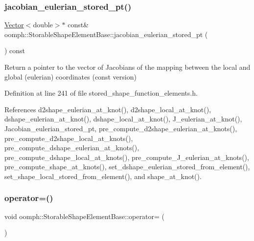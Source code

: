 \subsubsection{\texorpdfstring{jacobian\+\_\+eulerian\+\_\+stored\+\_\+pt()}{jacobian\_eulerian\_stored\_pt()}\hspace{0.1cm}{\footnotesize\ttfamily [2/2]}}
{\footnotesize\ttfamily \hyperlink{classoomph_1_1Vector}{Vector}$<$double$>$$\ast$ const\& oomph\+::\+Storable\+Shape\+Element\+Base\+::jacobian\+\_\+eulerian\+\_\+stored\+\_\+pt (\begin{DoxyParamCaption}{ }\end{DoxyParamCaption}) const\hspace{0.3cm}{\ttfamily [inline]}}



Return a pointer to the vector of Jacobians of the mapping between the local and global (eulerian) coordinates (const version) 



Definition at line 241 of file stored\+\_\+shape\+\_\+function\+\_\+elements.\+h.



References d2shape\+\_\+eulerian\+\_\+at\+\_\+knot(), d2shape\+\_\+local\+\_\+at\+\_\+knot(), dshape\+\_\+eulerian\+\_\+at\+\_\+knot(), dshape\+\_\+local\+\_\+at\+\_\+knot(), J\+\_\+eulerian\+\_\+at\+\_\+knot(), Jacobian\+\_\+eulerian\+\_\+stored\+\_\+pt, pre\+\_\+compute\+\_\+d2shape\+\_\+eulerian\+\_\+at\+\_\+knots(), pre\+\_\+compute\+\_\+d2shape\+\_\+local\+\_\+at\+\_\+knots(), pre\+\_\+compute\+\_\+dshape\+\_\+eulerian\+\_\+at\+\_\+knots(), pre\+\_\+compute\+\_\+dshape\+\_\+local\+\_\+at\+\_\+knots(), pre\+\_\+compute\+\_\+\+J\+\_\+eulerian\+\_\+at\+\_\+knots(), pre\+\_\+compute\+\_\+shape\+\_\+at\+\_\+knots(), set\+\_\+dshape\+\_\+eulerian\+\_\+stored\+\_\+from\+\_\+element(), set\+\_\+shape\+\_\+local\+\_\+stored\+\_\+from\+\_\+element(), and shape\+\_\+at\+\_\+knot().

\mbox{\label{classoomph_1_1StorableShapeElementBase_a16fe819cb078829ef2165749e4a6da24}} 
\subsubsection{\texorpdfstring{operator=()}{operator=()}}
{\footnotesize\ttfamily void oomph\+::\+Storable\+Shape\+Element\+Base\+::operator= (\begin{DoxyParamCaption}\item[{const \hyperlink{classoomph_1_1StorableShapeElementBase}{Storable\+Shape\+Element\+Base} \&}]{ }\end{DoxyParamCaption})\hspace{0.3cm}{\ttfamily [inline]}}



